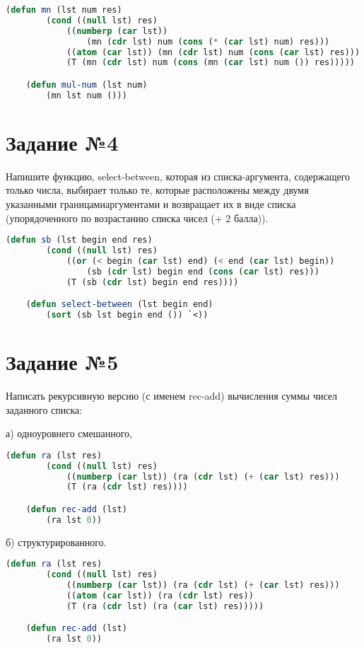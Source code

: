 \begin{lstlisting}[language=Lisp]
	(defun mn (lst num res)
		(cond ((null lst) res)
			((numberp (car lst))
				(mn (cdr lst) num (cons (* (car lst) num) res)))
			((atom (car lst)) (mn (cdr lst) num (cons (car lst) res)))
			(T (mn (cdr lst) num (cons (mn (car lst) num ()) res)))))

	(defun mul-num (lst num)
		(mn lst num ()))
\end{lstlisting}

\section{Задание №4}

Напишите функцию, select-between, которая из списка-аргумента, содержащего только
числа, выбирает только те, которые расположены между двумя указанными границамиаргументами и возвращает их в виде списка (упорядоченного по возрастанию списка чисел
(+ 2 балла)).

\begin{lstlisting}[language=Lisp]
	(defun sb (lst begin end res)
		(cond ((null lst) res)
			((or (< begin (car lst) end) (< end (car lst) begin))
				(sb (cdr lst) begin end (cons (car lst) res)))
			(T (sb (cdr lst) begin end res))))

	(defun select-between (lst begin end)
		(sort (sb lst begin end ()) `<))
\end{lstlisting}

\section{Задание №5}

Написать рекурсивную версию (с именем rec-add) вычисления суммы чисел заданного
списка:

а) одноуровнего смешанного,

\begin{lstlisting}[language=Lisp]
	(defun ra (lst res)
		(cond ((null lst) res)
			((numberp (car lst)) (ra (cdr lst) (+ (car lst) res)))
			(T (ra (cdr lst) res))))

	(defun rec-add (lst)
		(ra lst 0))
\end{lstlisting}

б) структурированного.

\begin{lstlisting}[language=Lisp]
	(defun ra (lst res)
		(cond ((null lst) res)
			((numberp (car lst)) (ra (cdr lst) (+ (car lst) res)))
			((atom (car lst)) (ra (cdr lst) res))
			(T (ra (cdr lst) (ra (car lst) res)))))

	(defun rec-add (lst)
		(ra lst 0))
\end{lstlisting}
